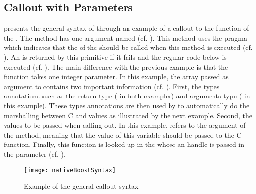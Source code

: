 \subsection{Callout with Parameters}

 presents the general syntax of \NBFFI through an example of a callout to the  function of the .
The  method has one argument named  (cf. ).
This method uses the pragma  which indicates that the  of the  should be called when this method is executed (cf. ).
An  is returned by this primitive if it fails and the regular \ST code below is executed (cf. ).
The main difference with the previous example is that the  function takes one integer parameter.
In this example, the array  passed as argument to  contains two important information (cf. ).
First, the types annotations such as the return type ( in both examples) and arguments type ( in this example).
These types annotations are then used by \NBFFI to automatically do the marshalling between C and \PH values as illustrated by the next example.
Second, the values to be passed when calling out.
In this example,  refers to the argument of the  method, meaning that the value of this variable should be passed to the  C function.
Finally, this  function is looked up in the  whose an handle is passed in the  parameter (cf. ).
%
%
\begin{figure}[H]
	\centering
	\texttt{[image: nativeBoostSyntax]}
	\caption[\NB Basic Method]{Example of the general \NBFFI callout syntax}
\end{figure}

